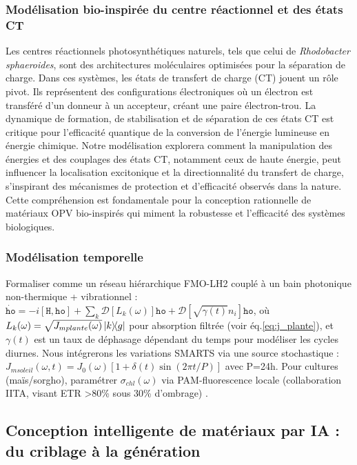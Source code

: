 \documentclass[12pt, a4paper]{article}
\begin{document}
\subsubsection{Modélisation bio-inspirée du centre réactionnel et des états CT}
Les centres réactionnels photosynthétiques naturels, tels que celui de \textit{Rhodobacter sphaeroides}, sont des architectures moléculaires optimisées pour la séparation de charge. Dans ces systèmes, les états de transfert de charge (CT) jouent un rôle pivot. Ils représentent des configurations électroniques où un électron est transféré d'un donneur à un accepteur, créant une paire électron-trou. La dynamique de formation, de stabilisation et de séparation de ces états CT est critique pour l'efficacité quantique de la conversion de l'énergie lumineuse en énergie chimique. Notre modélisation explorera comment la manipulation des énergies et des couplages des états CT, notamment ceux de haute énergie, peut influencer la localisation excitonique et la directionnalité du transfert de charge, s'inspirant des mécanismes de protection et d'efficacité observés dans la nature. Cette compréhension est fondamentale pour la conception rationnelle de matériaux OPV bio-inspirés qui miment la robustesse et l'efficacité des systèmes biologiques.

\subsubsection{Modélisation temporelle}

Formaliser comme un réseau hiérarchique FMO-LH2 couplé à un bain photonique non-thermique + vibrationnel : $\dot{\mathtt{ho}} = -i[\mathtt{H}, \mathtt{ho}] + \sum_k \mathcal{D}[L_k(\omega)] \mathtt{ho} + \mathcal{D}[\sqrt{\gamma(t)} n_i] \mathtt{ho}$, où $L_k(\omega) = \sqrt{J_{m plante}(\omega)} \op{k}{g}$ pour absorption filtrée (voir éq.\eqref{eq:j_plante}), et $\gamma(t)$ est un taux de déphasage dépendant du temps pour modéliser les cycles diurnes. Nous intégrerons les variations SMARTS via une source stochastique : $J_{m soleil}(\omega,t) = J_0(\omega) [1 + \delta(t) \sin(2\pi t / P)]$ avec P=24h. Pour cultures (maïs/sorgho), paramétrer $\sigma_{chl}(\omega)$ via PAM-fluorescence locale (collaboration IITA, visant ETR >80\% sous 30\% d'ombrage) \cite{Adeyemi2025}.

\subsection{Conception intelligente de matériaux par IA : du criblage à la génération}
\end{document}
